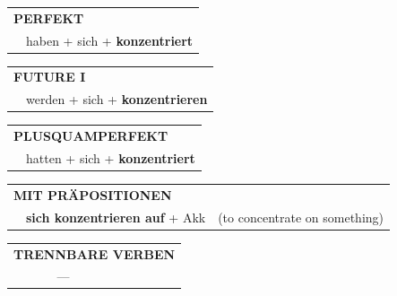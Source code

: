 \documentclass[10pt,a4paper]{revtex4-2}
\begin{document}
\begin{verbbox}
    \vspace{10pt}

 \begin{tabular}{rl}
     \multicolumn{2}{l}{\textbf{PERFEKT}}\\
    &haben + sich + \textbf{konzentriert}\\
  \end{tabular}
\hfill
   \begin{tabular}{rl}
   
    \multicolumn{2}{l}{\textbf{FUTURE I} }\\
    &werden + sich + \textbf{konzentrieren}\\
 
  \end{tabular}
\hfill
   \begin{tabular}{rl}
      \multicolumn{2}{l}{\textbf{PLUSQUAMPERFEKT}}\\
    &hatten + sich + \textbf{konzentriert}\\
  \end{tabular}
  
\vspace{10pt}

   \begin{tabular}{lll}
      \multicolumn{3}{l}{\textbf{MIT PRÄPOSITIONEN}}\\
& \textbf{sich konzentrieren auf} + Akk & (to concentrate on something)
  \end{tabular}
  \hfill
   \begin{tabular}{lll}
      \multicolumn{3}{l}{\textbf{TRENNBARE VERBEN}}\\
      & --- & \\
  \end{tabular}
  
  \vspace{-5pt}

\end{verbbox}
\end{document}

